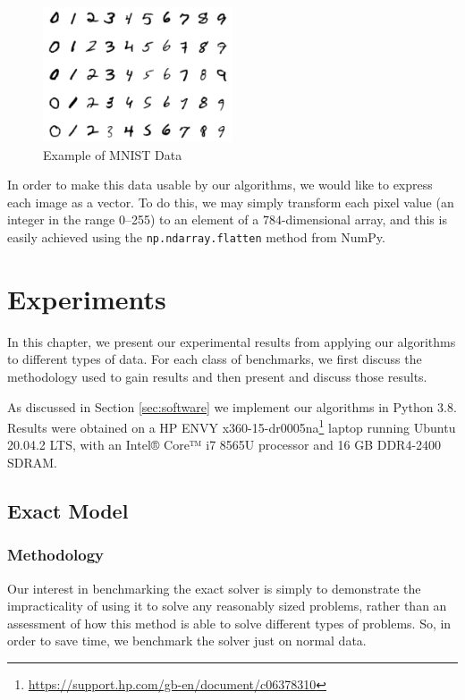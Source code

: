 \documentclass[11pt,twoside]{report}
\theoremstyle{definition}
\numberwithin{theorem}{section}
\numberwithin{definition}{section}
\numberwithin{lemma}{section}
\numberwithin{proposition}{section}
\numberwithin{equation}{section}
\numberwithin{figure}{section}
\begin{document}
\begin{figure}
    \centering
    \includegraphics[width=0.5\textwidth]{mnist_example.png}
    \caption{Example of MNIST Data}
    \label{fig:mnist_example}
\end{figure}

In order to make this data usable by our algorithms, we would like to express each image as a vector. To do this, we may simply transform each pixel value (an integer in the range 0--255) to an element of a $784$-dimensional array, and this is easily achieved using the \texttt{np.ndarray.flatten} method from NumPy.



\chapter{Experiments}\label{experiments}
In this chapter, we present our experimental results from applying our algorithms to different types of data. For each class of benchmarks, we first discuss the methodology used to gain results and then present and discuss those results.

As discussed in Section \ref{sec:software} we implement our algorithms in Python 3.8. Results were obtained on a HP ENVY x360-15-dr0005na\footnote{\url{https://support.hp.com/gb-en/document/c06378310}} laptop running Ubuntu 20.04.2 LTS, with an Intel® Core™ i7 8565U  processor and 16 GB DDR4-2400 SDRAM.


\section{Exact Model}\label{exact benchmarks}
\subsection{Methodology}
Our interest in benchmarking the exact solver is simply to demonstrate the impracticality of using it to solve any reasonably sized problems, rather than an assessment of how this method is able to solve different types of problems. So, in order to save time, we benchmark the solver just on normal data.
\end{document}
